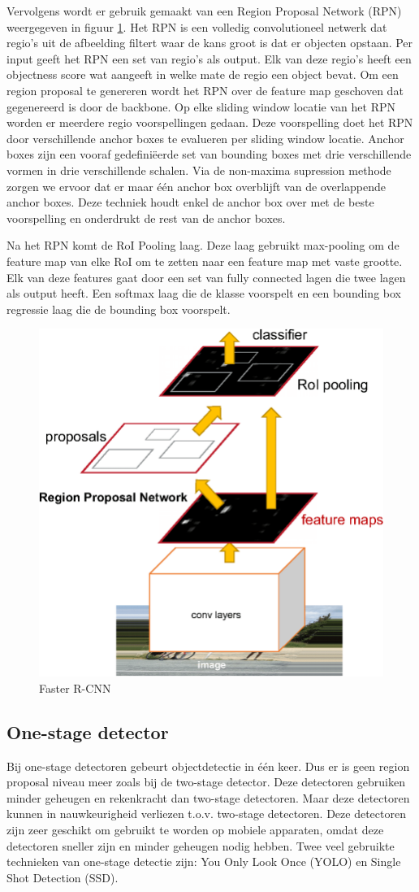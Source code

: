 Vervolgens wordt er gebruik gemaakt van een Region Proposal Network (RPN) weergegeven in figuur \ref{fig:faster-r-cnn}. 
Het RPN is een volledig convolutioneel netwerk dat regio's uit de afbeelding filtert waar de kans groot is dat er objecten opstaan.
Per input geeft het RPN een set van regio's als output.
Elk van deze regio's heeft een objectness score wat aangeeft in welke mate de regio een object bevat.
Om een region proposal te genereren wordt het RPN over de feature map geschoven dat gegenereerd is door de backbone.
Op elke sliding window locatie van het RPN worden er meerdere regio voorspellingen gedaan.
Deze voorspelling doet het RPN door verschillende anchor boxes te evalueren per sliding window locatie.
Anchor boxes zijn een vooraf gedefini\"eerde set van bounding boxes met drie verschillende vormen in drie verschillende schalen.
Via de non-maxima supression methode zorgen we ervoor dat er maar \'e\'en anchor box overblijft van de overlappende anchor boxes. 
Deze techniek houdt enkel de anchor box over met de beste voorspelling en onderdrukt de rest van de anchor boxes.

Na het RPN komt de RoI Pooling laag.
Deze laag gebruikt max-pooling om de feature map van elke RoI om te zetten naar een feature map met vaste grootte.
Elk van deze features gaat door een set van fully connected lagen die twee lagen als output heeft.
Een softmax laag die de klasse voorspelt en een bounding box regressie laag die de bounding box voorspelt.

\begin{figure}[!ht]
    \centering
 	\includegraphics[width=0.35\linewidth]{fig/Faster-R-CNN.png}
 	\caption{Faster R-CNN}
 	\label{fig:faster-r-cnn}
\end{figure}

\subsection{One-stage detector}
Bij one-stage detectoren gebeurt objectdetectie in \'e\'en keer. 
Dus er is geen region proposal niveau meer zoals bij de two-stage detector. 
Deze detectoren gebruiken minder geheugen en rekenkracht dan two-stage detectoren.
Maar deze detectoren kunnen in nauwkeurigheid verliezen t.o.v. two-stage detectoren.
Deze detectoren zijn zeer geschikt om gebruikt te worden op mobiele apparaten, omdat deze detectoren sneller zijn en minder geheugen nodig hebben.
Twee veel gebruikte technieken van one-stage detectie zijn: You Only Look Once (YOLO) en Single Shot Detection (SSD).

